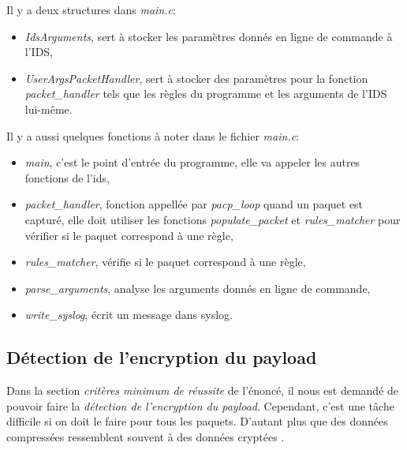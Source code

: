 \documentclass[a4paper]{article}
\begin{document}
Il y a deux structures dans \textit{main.c}:
\begin{itemize}
    \item \textit{IdsArguments}, sert à stocker les paramètres donnés en ligne de commande à l'IDS,
    \item \textit{UserArgsPacketHandler}, sert à stocker des paramètres pour la fonction \textit{packet\_handler} tels que les règles du programme et les arguments de l'IDS lui-même.
\end{itemize}
Il y a aussi quelques fonctions à noter dans le fichier \textit{main.c}:
\begin{itemize}
    \item \textit{main}, c'est le point d'entrée du programme, elle va appeler les autres fonctions de l'ids,
    \item \textit{packet\_handler}, fonction appellée par \textit{pacp\_loop} quand un paquet est capturé, elle doit utiliser les fonctions \textit{populate\_packet} et \textit{rules\_matcher} pour vérifier si le paquet correspond à une règle,
    \item \textit{rules\_matcher}, vérifie si le paquet correspond à une règle,
    \item \textit{parse\_arguments}, analyse les arguments donnés en ligne de commande,
    \item \textit{write\_syslog}, écrit un message dans syslog.
\end{itemize}





\subsection{Détection de l’encryption du payload}



Dans la section \textit{critères minimum de réussite} de l'énoncé, il nous est demandé de pouvoir faire la \textit{détection de l'encryption du payload}. Cependant, c'est une tâche difficile si on doit le faire pour tous les paquets. D'autant plus que des données compressées ressemblent souvent à des données cryptées \cite{3}.
\end{document}
